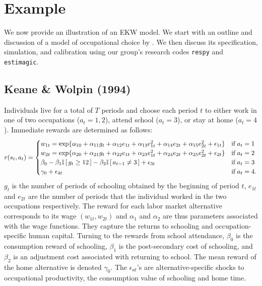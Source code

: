 \section{Example}\label{Example}
We now provide an illustration of an EKW model. We start with an outline and discussion of a model of occupational choice by \citet{Keane.1994}. We then discuss its specification, simulation, and calibration using our group's research codes \verb+respy+ and \verb+estimagic+.
\subsection{Keane \& Wolpin (1994)}
Individuals live for a total of $T$ periods and choose each period $t$ to either work in one of two occupations ($a_t = 1, 2$), attend school ($a_t = 3$), or stay at home ($a_t = 4$). Immediate rewards are determined as follows:
%
\begin{align*}
r(s_t, a_t) = \begin{cases} w_{1t} =
\exp\{\alpha_{10} + \alpha_{11}g_t + \alpha_{12}e_{1t} + \alpha_{13}e^2_{1t} + \alpha_{14}e_{2t} + \alpha_{15}e^2_{2t} + \epsilon_{1t}\} & \text{if}\; a_t = 1 \\
w_{2t} = \exp\{\alpha_{20} + \alpha_{21}g_t + \alpha_{22}e_{1t} + \alpha_{23}e^2_{1t} + \alpha_{24}e_{2t} + \alpha_{25}e^2_{2t} + \epsilon_{2t}\}& \text{if}\; a_t = 2 \\
\beta_0 - \beta_1 \mathbb{I}\,[\,g_t \geq 12\,] - \beta_2\mathbb{I}\,[\,a_{t - 1} \neq 3\,] + \epsilon_{3t}& \text{if}\; a_t = 3 \\
\gamma_0 + \epsilon_{4t}& \text{if}\; a_t = 4. \\
\end{cases}
\end{align*}
%
$g_t$ is the number of periods of schooling obtained by the beginning of period $t$, $e_{1t}$ and $e_{2t}$ are the number of periods that the individual worked in the two occupations respectively. The reward for each labor market alternative corresponds to its wage $(w_{1t}, w_{2t})$ and $\alpha_{1}$ and $\alpha_{2}$ are thus parameters associated with the wage functions. They capture the returns to schooling and occupation-specific human capital. Turning to the rewards from school attendance, $\beta_0$ is the consumption reward of schooling, $\beta_1$ is the post-secondary cost of schooling, and $\beta_2$ is an adjustment cost associated with returning to school. The mean reward of the home alternative is denoted $\gamma_0$. The $\epsilon_{at}$'s are alternative-specific shocks to occupational productivity, the consumption value of schooling and home time.\\

